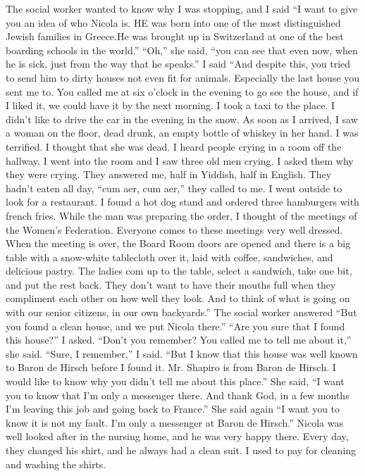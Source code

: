 The social worker wanted to know why I was stopping, and I said “I want to give you an idea of who Nicola is.
HE was born into one of the most distinguished Jewish families in Greece.He was brought up in Switzerland at one of the best boarding schools in the world.”
“Oh,” she said, “you can see that even now, when he is sick, just from the way that he speaks.”
I said “And despite this, you tried to send him to dirty houses not even fit for animals.
Especially the last house you sent me to.
You called me at six o’clock in the evening to go see the house, and if I liked it, we could have it by the next morning.
I took a taxi to the place.
I didn’t like to drive the car in the evening in the snow.
As soon as I arrived, I saw a woman on the floor, dead drunk, an empty bottle of whiskey in her hand.
I was terrified.
I thought that she was dead.
I heard people crying in a room off the hallway.
I went into the room and I saw three old men crying.
I asked them why they were crying.
They answered me, half in Yiddish, half in English.
They hadn’t eaten all day, “cum aer, cum aer,” they called to me.
I went outside to look for a restaurant.
I found a hot dog stand and ordered three hamburgers with french fries.
While the man was preparing the order, I thought of the meetings of the Women’s Federation.
Everyone comes to these meetings very well dressed.
When the meeting is over, the Board Room doors are opened and there is a big table with a snow-white tablecloth over it, laid with coffee, sandwiches, and delicious pastry.
The ladies com up to the table, select a sandwich, take one bit, and put the rest back.
They don’t want to have their mouths full when they compliment each other on how well they look.
And to think of what is going on with our senior citizens, in our own backyards.” 
The social worker answered “But you found a clean house, and we put Nicola there.”
“Are you sure that I found this house?” I asked.
“Don’t you remember?
You called me to tell me about it,” she said.
“Sure, I remember,” I said.
“But I know that this house was well known to Baron de Hirsch before I found it.
Mr.
Shapiro is from Baron de Hirsch.
I would like to know why you didn’t tell me about this place.”
She said, “I want you to know that I’m only a messenger there.
And thank God, in a few months I’m leaving this job and going back to France.” She said again “I want you to know it is not my fault.
I’m only a messenger at Baron de Hirsch.”
Nicola was well looked after in the nursing home, and he was very happy there.
Every day, they changed his shirt, and he always had a clean suit.
I used to pay for cleaning and washing the shirts.

